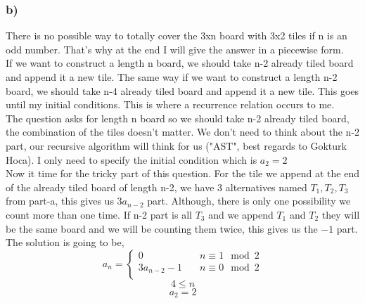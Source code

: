 \documentclass[12pt]{article}
\begin{document}
\subsubsection*{b)}
There is no possible way to totally cover the 3xn board with 3x2 tiles if n is an odd number. That's why at the end I will give the answer in a piecewise form. \\
If we want to construct a length n board, we should take n-2 already tiled board and append it a new tile. The same way if we want to construct a length n-2 board, we should take n-4 already tiled board and append it a new tile. This goes until my initial conditions. This is where a recurrence relation occurs to me. \\
The question asks for length n board so we should take n-2 already tiled board, the combination of the tiles doesn't matter. We don't need to think about the n-2 part, our recursive algorithm will think for us ("AST", best regards to Gokturk Hoca). I only need to specify the initial condition which is $a_2=2$\\
Now it time for the tricky part of this question. For the tile we append at the end of the already tiled board of length n-2, we have 3 alternatives named $T_1,T_2,T_3$ from part-a, this gives us $3a_{n-2}$ part. Although, there is only one possibility we count more than one time. If n-2 part is all $T_3$ and we append $T_1$ and $T_2$ they will be the same board and we will be counting them twice, this gives us the $-1$ part. The solution is going to be,
$$
a_n = \left\{
        \begin{array}{ll}
            0 & \quad n \equiv 1\mod 2 \\
            3a_{n-2}-1 & \quad n \equiv 0\mod 2 \\
        \end{array}
    \right.
$$
$$4 \leq n$$
$$a_2=2$$
\vspace{2cm}
\end{document}
